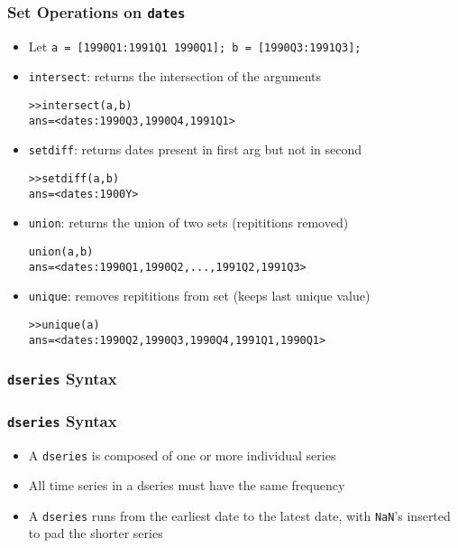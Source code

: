 \documentclass[10pt]{beamer}
\newcommand{\myitem}{\item[$\bullet$]}
\begin{document}
\begin{frame}[fragile,t]
  \frametitle{Set Operations on \texttt{dates}}
  \begin{itemize}
    \myitem Let \texttt{a = [1990Q1:1991Q1 1990Q1]; b = [1990Q3:1991Q3];}
    \myitem \texttt{intersect}: returns the intersection of the arguments
    \begin{alltt}
  >> intersect(a, b)
  ans = <dates: 1990Q3, 1990Q4, 1991Q1>
    \end{alltt}
    \myitem \texttt{setdiff}: returns dates present in first arg but not in second
    \begin{alltt}
  >> setdiff(a, b)
  ans = <dates: 1900Y>
    \end{alltt}
    \myitem \texttt{union}: returns the union of two sets (repititions removed)
    \begin{alltt}
  union(a, b)
  ans = <dates: 1990Q1, 1990Q2,  ..., 1991Q2, 1991Q3>
    \end{alltt}
    \myitem \texttt{unique}: removes repititions from set (keeps last unique value)
    \begin{alltt}
  >> unique(a)
  ans = <dates: 1990Q2, 1990Q3, 1990Q4, 1991Q1, 1990Q1>
    \end{alltt}
  \end{itemize}
\end{frame}



%
%
\subsubsection{\texttt{dseries} Syntax}
\begin{frame}[fragile,t]
  \frametitle{\texttt{dseries} Syntax}
  \begin{itemize}
  \myitem A \texttt{dseries} is composed of one or more individual series
  \myitem All time series in a dseries must have the same frequency
  \myitem A \texttt{dseries} runs from the earliest date to the latest date, with \texttt{NaN}'s inserted to pad the shorter series
  \end{itemize}
\end{frame}
\end{document}
